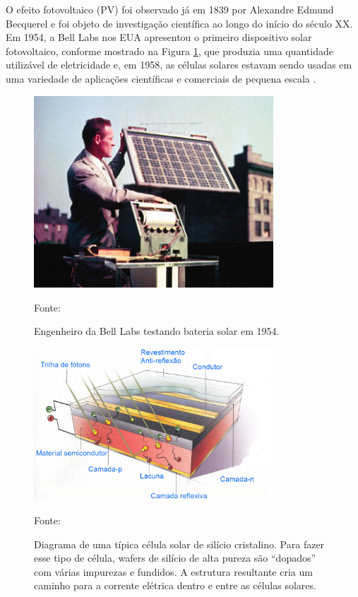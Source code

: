 O efeito fotovoltaico (PV) foi observado já em 1839 por Alexandre Edmund Becquerel e foi objeto de investigação científica ao longo do início do século XX. Em 1954, a Bell Labs nos EUA apresentou o primeiro dispositivo solar fotovoltaico, conforme mostrado na Figura \ref{fig:1954_solar2}, que produzia uma quantidade utilizável de eletricidade e, em 1958, as células solares estavam sendo usadas em uma variedade de aplicações científicas e comerciais de pequena escala \cite{belllabs_photovoltaics}.

\begin{figure}[H]
    \centering
    \includegraphics[width=0.8\textwidth]{./Figuras/1954_solar2.jpg}
    \caption{Engenheiro da Bell Labs testando bateria solar em 1954.}{Fonte: \cite{belllabs_photovoltaics}}
   \label{fig:1954_solar2}
\end{figure}

\begin{figure}[H]
    \centering
    \includegraphics[width=0.8\textwidth]{./Figuras/pv-cell.jpg}
    \caption{Diagrama de uma típica célula solar de silício cristalino. Para fazer esse tipo de célula, wafers de silício de alta pureza são “dopados” com várias impurezas e fundidos. A estrutura resultante cria um caminho para a corrente elétrica dentro e entre as células solares.}{Fonte: \cite{seia}}
   \label{fig:pv-cell}
\end{figure}

